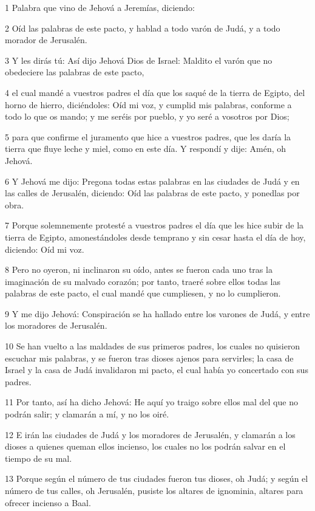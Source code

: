 \par 1 Palabra que vino de Jehová a Jeremías, diciendo:
\par 2 Oíd las palabras de este pacto, y hablad a todo varón de Judá, y a todo morador de Jerusalén.
\par 3 Y les dirás tú: Así dijo Jehová Dios de Israel: Maldito el varón que no obedeciere las palabras de este pacto,
\par 4 el cual mandé a vuestros padres el día que los saqué de la tierra de Egipto, del horno de hierro, diciéndoles: Oíd mi voz, y cumplid mis palabras, conforme a todo lo que os mando; y me seréis por pueblo, y yo seré a vosotros por Dios;
\par 5 para que confirme el juramento que hice a vuestros padres, que les daría la tierra que fluye leche y miel, como en este día. Y respondí y dije: Amén, oh Jehová.
\par 6 Y Jehová me dijo: Pregona todas estas palabras en las ciudades de Judá y en las calles de Jerusalén, diciendo: Oíd las palabras de este pacto, y ponedlas por obra.
\par 7 Porque solemnemente protesté a vuestros padres el día que les hice subir de la tierra de Egipto, amonestándoles desde temprano y sin cesar hasta el día de hoy, diciendo: Oíd mi voz.
\par 8 Pero no oyeron, ni inclinaron su oído, antes se fueron cada uno tras la imaginación de su malvado corazón; por tanto, traeré sobre ellos todas las palabras de este pacto, el cual mandé que cumpliesen, y no lo cumplieron.
\par 9 Y me dijo Jehová: Conspiración se ha hallado entre los varones de Judá, y entre los moradores de Jerusalén.
\par 10 Se han vuelto a las maldades de sus primeros padres, los cuales no quisieron escuchar mis palabras, y se fueron tras dioses ajenos para servirles; la casa de Israel y la casa de Judá invalidaron mi pacto, el cual había yo concertado con sus padres.
\par 11 Por tanto, así ha dicho Jehová: He aquí yo traigo sobre ellos mal del que no podrán salir; y clamarán a mí, y no los oiré.
\par 12 E irán las ciudades de Judá y los moradores de Jerusalén, y clamarán a los dioses a quienes queman ellos incienso, los cuales no los podrán salvar en el tiempo de su mal.
\par 13 Porque según el número de tus ciudades fueron tus dioses, oh Judá; y según el número de tus calles, oh Jerusalén, pusiste los altares de ignominia, altares para ofrecer incienso a Baal.
